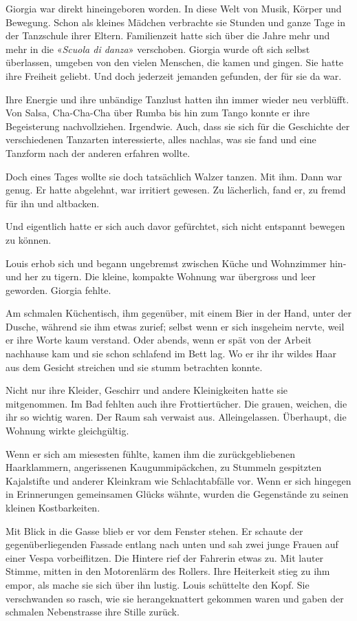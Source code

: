 Giorgia war direkt hineingeboren worden. In diese Welt von Musik, Körper
und Bewegung. Schon als kleines Mädchen verbrachte sie Stunden und ganze
Tage in der Tanzschule ihrer Eltern. Familienzeit hatte sich über die
Jahre mehr und mehr in die «\emph{Scuola di danza}» verschoben. Giorgia
wurde oft sich selbst überlassen, umgeben von den vielen Menschen, die
kamen und gingen. Sie hatte ihre Freiheit geliebt. Und doch jederzeit
jemanden gefunden, der für sie da war.

Ihre Energie und ihre unbändige Tanzlust hatten ihn immer wieder neu
verblüfft. Von Salsa, Cha-Cha-Cha über Rumba bis hin zum Tango konnte er
ihre Begeisterung nachvollziehen. Irgendwie. Auch, dass sie sich für die
Geschichte der verschiedenen Tanzarten interessierte, alles nachlas, was
sie fand und eine Tanzform nach der anderen erfahren wollte.

Doch eines Tages wollte sie doch tatsächlich Walzer tanzen. Mit ihm.
Dann war genug. Er hatte abgelehnt, war irritiert gewesen. Zu
lächerlich, fand er, zu fremd für ihn und altbacken.

Und eigentlich hatte er sich auch davor gefürchtet, sich nicht entspannt
bewegen zu können.

Louis erhob sich und begann ungebremst zwischen Küche und Wohnzimmer
hin- und her zu tigern. Die kleine, kompakte Wohnung war übergross und
leer geworden. Giorgia fehlte.

Am schmalen Küchentisch, ihm gegenüber, mit einem Bier in der Hand,
unter der Dusche, während sie ihm etwas zurief; selbst wenn er sich
insgeheim nervte, weil er ihre Worte kaum verstand. Oder abends, wenn er
spät von der Arbeit nachhause kam und sie schon schlafend im Bett lag.
Wo er ihr ihr wildes Haar aus dem Gesicht streichen und sie stumm
betrachten konnte.

Nicht nur ihre Kleider, Geschirr und andere Kleinigkeiten hatte sie
mitgenommen. Im Bad fehlten auch ihre Frottiertücher. Die grauen,
weichen, die ihr so wichtig waren. Der Raum sah verwaist aus.
Alleingelassen. Überhaupt, die Wohnung wirkte gleichgültig.

Wenn er sich am miesesten fühlte, kamen ihm die zurückgebliebenen
Haarklammern, angerissenen Kaugummipäckchen, zu Stummeln gespitzten
Kajalstifte und anderer Kleinkram wie Schlachtabfälle vor. Wenn er sich
hingegen in Erinnerungen gemeinsamen Glücks wähnte, wurden die
Gegenstände zu seinen kleinen Kostbarkeiten.

Mit Blick in die Gasse blieb er vor dem Fenster stehen. Er schaute der
gegenüberliegenden Fassade entlang nach unten und sah zwei junge Frauen
auf einer Vespa vorbeiflitzen. Die Hintere rief der Fahrerin etwas zu.
Mit lauter Stimme, mitten in den Motorenlärm des Rollers. Ihre
Heiterkeit stieg zu ihm empor, als mache sie sich über ihn lustig. Louis
schüttelte den Kopf. Sie verschwanden so rasch, wie sie herangeknattert
gekommen waren und gaben der schmalen Nebenstrasse ihre Stille zurück.

